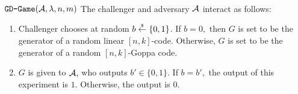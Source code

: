 

\begin{definition}
\,\
\begin{weirdFrame}{$\texttt{GD-Game}(\mathcal{A},\lambda,n,m)$}
The challenger and adversary $\mathcal{A}$ interact as follows:
\begin{enumerate}
\item Challenger chooses at random $b \overset{{\scriptscriptstyle\$}}{\leftarrow} \{0,1\}$. 
If $b = 0,$ then $G$ is set to be the generator of a random linear $[n,k]$-code.
Otherwise, $G$ is set to be the generator of a random $[n,k]$-Goppa code.
\item $G$ is given to $\mathcal{A},$ who outputs $b' \in \{0,1\}$.
If $b = b',$ the output of this experiment is $1.$
Otherwise, the output is $0.$
\end{enumerate}
\end{weirdFrame}
\end{definition}